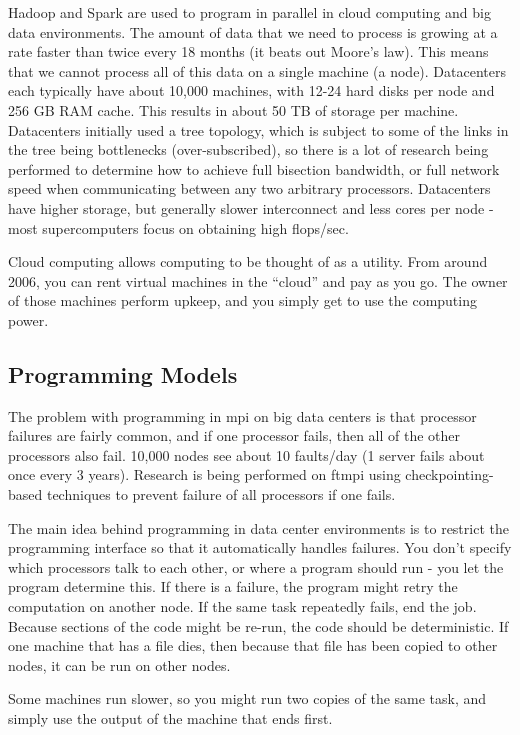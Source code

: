 \documentclass[10pt]{article}
\begin{document}
\begin{flushleft}
Hadoop and Spark are used to program in parallel in cloud computing and big data environments. The amount of data that we need to process is growing at a rate faster than twice every 18 months (it beats out Moore's law). This means that we cannot process all of this data on a single machine (a node). Datacenters each typically have about 10,000 machines, with 12-24 hard disks per node and 256 GB RAM cache. This results in about 50 TB of storage per machine. Datacenters initially used a tree topology, which is subject to some of the links in the tree being bottlenecks (over-subscribed), so there is a lot of research being performed to determine how to achieve full bisection bandwidth, or full network speed when communicating between any two arbitrary processors. Datacenters have higher storage, but generally slower interconnect and less cores per node - most supercomputers focus on obtaining high flops/sec.

Cloud computing allows computing to be thought of as a utility. From around 2006, you can rent virtual machines in the ``cloud'' and pay as you go. The owner of those machines perform upkeep, and you simply get to use the computing power. 

\subsection{Programming Models}

The problem with programming in \gls{mpi} on big data centers is that processor failures are fairly common, and if one processor fails, then all of the other processors also fail. 10,000 nodes see about 10 faults/day (1 server fails about once every 3 years). Research is being performed on \gls{ftmpi} using checkpointing-based techniques to prevent failure of all processors if one fails.

The main idea behind programming in data center environments is to restrict the programming interface so that it automatically handles failures. You don't specify which processors talk to each other, or where a program should run - you let the program determine this. If there is a failure, the program might retry the computation on another node. If the same task repeatedly fails, end the job. Because sections of the code might be re-run, the code should be deterministic. If one machine that has a file dies, then because that file has been copied to other nodes, it can be run on other nodes. 

Some machines run slower, so you might run two copies of the same task, and simply use the output of the machine that ends first. 


\end{flushleft}
\end{document}
